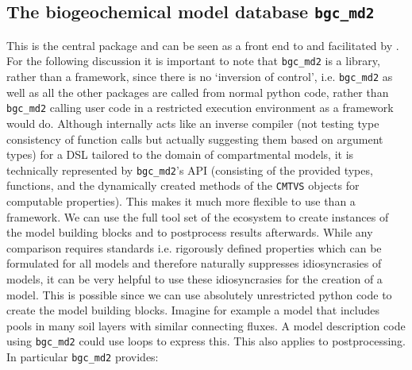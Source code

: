 \subsection{The biogeochemical model database \texttt{bgc\_md2}} This is the
central package and can be seen as a front end to \CompartmentalSystems{} and
\LAPM{} facilitated by \ComputabilityGraphs{}.  For the following discussion it is
important to note that \texttt{bgc\_md2} is a library, rather than a framework,
since there is no `inversion of control', i.e. \texttt{bgc\_md2} as well as all
the other packages are called from normal python code, rather than
\texttt{bgc\_md2} calling user code in a restricted execution environment as a
framework would do. 
Although internally \ComputabilityGraphs{} acts like an inverse
compiler  (not testing type consistency of function calls but
actually suggesting them based on argument types) for a DSL  tailored to the domain of compartmental
models, it is technically represented by \texttt{bgc\_md2}'s API (consisting of
the provided types, functions, and the dynamically created methods of the
\texttt{CMTVS} objects for computable properties).  This makes it much more
flexible to use than a framework. We can use the full tool set of the
\python{} ecosystem to create instances of the model building blocks and to
postprocess results afterwards.  While any comparison requires standards i.e.
rigorously defined properties which can be formulated for all models and
therefore naturally suppresses idiosyncrasies of models, it can be very helpful
to use these idiosyncrasies for the creation of a model.  This is possible
since we can use absolutely unrestricted python code to create the model
building blocks.  Imagine for example a model that includes pools in many soil
layers with similar connecting fluxes. A model description code using
\texttt{bgc\_md2} could use loops to express this.  This also applies to
postprocessing. 
In particular \texttt{bgc\_md2} provides:
